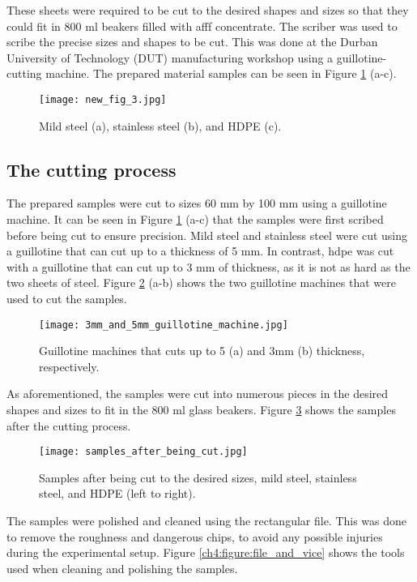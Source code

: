 These sheets were required to be cut to the desired shapes and sizes so that they could fit in 800 ml beakers filled with \acrshort{afff} concentrate. The scriber was used to scribe the precise sizes and shapes to be cut. This was done at the Durban University of Technology (DUT) manufacturing workshop using a guillotine-cutting machine. The prepared material samples can be seen in Figure \ref{ch4:figure:samples} (a-c).

\begin{figure}[H]
    \centering
    \texttt{[image: new\_fig\_3.jpg]}
    \caption{Mild steel (a), stainless steel (b), and HDPE (c).}
    \label{ch4:figure:samples}
\end{figure}

\subsection{The cutting process}
The prepared samples were cut to sizes 60 mm by 100 mm using a guillotine machine. It can be seen in Figure \ref{ch4:figure:samples} (a-c) that the samples were first scribed before being cut to ensure precision. Mild steel and stainless steel were cut using a guillotine that can cut up to a thickness of 5 mm. In contrast, \acrshort{hdpe} was cut with a guillotine that can cut up to 3 mm of thickness, as it is not as hard as the two sheets of steel. Figure \ref{ch4:figure:guillotines} (a-b) shows the two guillotine machines that were used to cut the samples.

\begin{figure}[H]
    \centering
    \texttt{[image: 3mm\_and\_5mm\_guillotine\_machine.jpg]}
    \caption{Guillotine machines that cuts up to 5 (a) and 3mm (b) thickness, respectively.}
    \label{ch4:figure:guillotines}
\end{figure}

As aforementioned, the samples were cut into numerous pieces in the desired shapes and sizes to fit in the 800 ml glass beakers. Figure \ref{ch4:figure:samples_cut} shows the samples after the cutting process.

\begin{figure}[H]
    \centering
    \texttt{[image: samples\_after\_being\_cut.jpg]}
    \caption{Samples after being cut to the desired sizes, mild steel, stainless steel, and HDPE (left to right).}
    \label{ch4:figure:samples_cut}
\end{figure}

The samples were polished and cleaned using the rectangular file. This was done to remove the roughness and dangerous chips, to avoid any possible injuries during the experimental setup. Figure \ref{ch4:figure:file_and_vice} shows the tools used when cleaning and polishing the samples.
 
